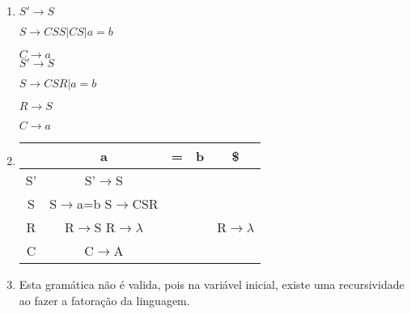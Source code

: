 \begin{question}

    \begin{enumerate}[label=\textbf{\arabic*})]
        \item 
        $S' \rightarrow S$

        $S \rightarrow CSS | CS | a = b$
    
        $C \rightarrow a$ \\
    
        $S' \rightarrow S$ 
    
        $S \rightarrow CS R | a = b$
    
        $R \rightarrow S$
    
        $C \rightarrow a$
        \item 
        
        \begin{minipage}{\textwidth}
            \centering 
            \begin{tabular}{|c | c | c | c | c |} 
                \hline
                  & a & = & b & \$ \\ [0.5ex] 
                \hline
                S' & S'$\rightarrow$S &  &  & \\ 
                \hline
                S & S$\rightarrow$a=b S$\rightarrow$CSR & & & \\
                \hline
                R & R$\rightarrow$S R$\rightarrow \lambda$ & & & R$\rightarrow \lambda$ \\
                \hline
                C & C$\rightarrow$A & & & \\
                \hline
            \end{tabular}
        \end{minipage}
        
        \item 

        Esta gramática não é valida, pois na variável inicial, existe uma recursividade 
        ao fazer a fatoração da linguagem.
    \end{enumerate}

\end{question}

